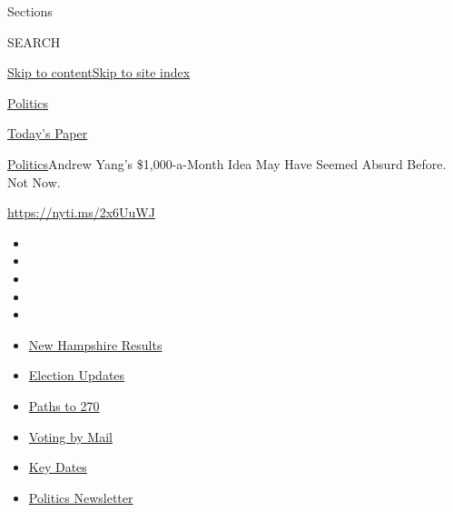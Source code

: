 Sections

SEARCH

\protect\hyperlink{site-content}{Skip to
content}\protect\hyperlink{site-index}{Skip to site index}

\href{https://www.nytimes3xbfgragh.onion/section/politics}{Politics}

\href{https://myaccount.nytimes3xbfgragh.onion/auth/login?response_type=cookie\&client_id=vi}{}

\href{https://www.nytimes3xbfgragh.onion/section/todayspaper}{Today's
Paper}

\href{/section/politics}{Politics}\textbar{}Andrew Yang's
\$1,000-a-Month Idea May Have Seemed Absurd Before. Not Now.

\url{https://nyti.ms/2x6UuWJ}

\begin{itemize}
\item
\item
\item
\item
\item
\end{itemize}

\begin{itemize}
\item
  \href{https://www.nytimes3xbfgragh.onion/interactive/2020/09/08/us/elections/results-new-hampshire-primary-elections.html?action=click\&pgtype=Article\&state=default\&region=TOP_BANNER\&context=storylines_menu}{New
  Hampshire Results}
\item
  \href{https://www.nytimes3xbfgragh.onion/live/2020/09/09/us/trump-vs-biden?action=click\&pgtype=Article\&state=default\&region=TOP_BANNER\&context=storylines_menu}{Election
  Updates}
\item
  \href{https://www.nytimes3xbfgragh.onion/interactive/2020/us/elections/election-states-biden-trump.html?action=click\&pgtype=Article\&state=default\&region=TOP_BANNER\&context=storylines_menu}{Paths
  to 270}
\item
  \href{https://www.nytimes3xbfgragh.onion/interactive/2020/08/31/us/politics/vote-by-mail-deadlines.html?action=click\&pgtype=Article\&state=default\&region=TOP_BANNER\&context=storylines_menu}{Voting
  by Mail}
\item
  \href{https://www.nytimes3xbfgragh.onion/interactive/2019/us/elections/2020-presidential-election-calendar.html?action=click\&pgtype=Article\&state=default\&region=TOP_BANNER\&context=storylines_menu}{Key
  Dates}
\item
  \href{https://www.nytimes3xbfgragh.onion/newsletters/politics?action=click\&pgtype=Article\&state=default\&region=TOP_BANNER\&context=storylines_menu}{Politics
  Newsletter}
\end{itemize}


